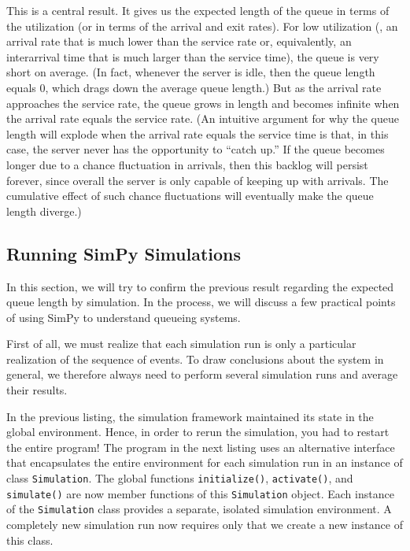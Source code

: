 This is a central result. It gives us the expected length of the queue
in terms of the utilization (or in terms of the arrival and exit
rates). For low utilization (\ie, an arrival rate that is much lower
than the service rate or, equivalently, an interarrival time that is
much larger than the service time), the queue is very short on
average.  (In fact, whenever the server is idle, then the queue length
equals $0$, which drags down the average queue length.)  But as the
arrival rate approaches the service rate, the queue grows in length
and becomes infinite when the arrival rate equals the service rate.
(An intuitive argument for why the queue length will explode when the
arrival rate equals the service time is that, in this case, the server
never has the opportunity to ``catch up.'' If the queue becomes longer
due to a chance fluctuation in arrivals, then this backlog will
persist forever, since overall the server is only capable of keeping
up with arrivals. The cumulative effect of such chance fluctuations
will eventually make the queue length diverge.)




\subsection{Running SimPy Simulations}

 
In this section, we will try to confirm the previous result regarding
the expected queue length by simulation. In the process, we will
discuss a few practical points of using SimPy to understand queueing
systems.

First of all, we must realize that each simulation run is only a
particular realization of the sequence of events. To draw conclusions
about the system in general, we therefore always need to perform
several simulation runs and average their results.

In the previous listing, the simulation framework maintained its state
in the global environment. Hence, in order to rerun the simulation,
you had to restart the entire program! The program in the next listing
uses an alternative interface that encapsulates the entire environment
for each simulation run in an instance of class \texttt{Simulation}.  
The global functions \texttt{initialize()}, \texttt{activate()}, and
\texttt{simulate()} are now member functions of this
\texttt{Simulation} object. Each instance of the \texttt{Simulation}
class provides a separate, isolated simulation environment. A
completely new simulation run now requires only that we create a new
instance of this class.

